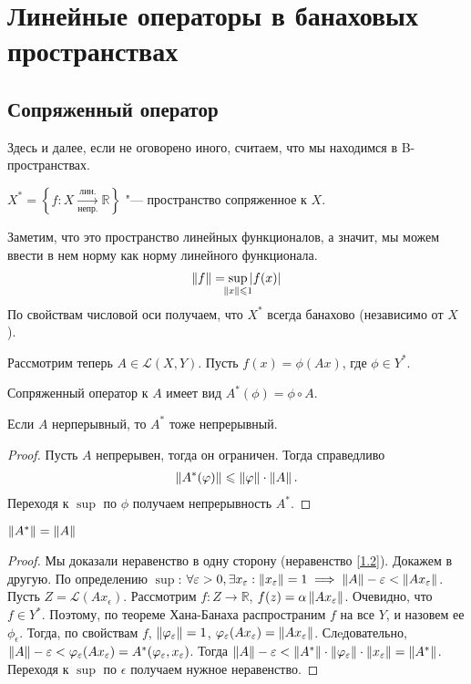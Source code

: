 \section{Линейные операторы в банаховых пространствах}
\subsection{Сопряженный оператор}

Здесь и далее, если не оговорено иного, считаем, что мы находимся в B-пространствах.

\begin{definition}
    $X^* = \left\{ f : X \xrightarrow[\text{непр.}]{\text{лин.}} \mathbb{R} \right\}$ "--- пространство сопряженное к $X$.
\end{definition}
Заметим, что это пространство линейных функционалов, а значит, мы можем ввести в нем норму как норму линейного функционала.
\begin{gather}
    \norm{f} = \sup_{\mathclap{\norm{x} \leqslant 1}} \abs{f(x)}  \\
\end{gather}
По свойствам числовой оси получаем, что $X^*$ всегда банахово (независимо от $X$).

Рассмотрим теперь $A \in \mathcal{L}(X, Y)$. Пусть $f(x) = \phi(Ax)$, где $\phi \in Y^*$.
\begin{definition}
    Сопряженный оператор к $A$ имеет вид $A^*(\phi) = \phi \circ A$.
\end{definition}
\begin{statement}
    Если $A$ нерперывный, то $A^*$ тоже непрерывный.
\end{statement}
\begin{proof}
    Пусть $A$ непрерывен, тогда он ограничен. Тогда справедливо
    \begin{gather}
        \left\|A^*(\varphi)\right\| \leqslant \left\|\varphi\right\| \cdot \left\|A\right\|\text{.} \label{1.2}
    \end{gather}
    Переходя к $\sup$ по $\phi$ получаем непрерывность $A^*$.
\end{proof}
\begin{theorem} \label{th1.2}
    $\left\|A^*\right\| = \left\|A\right\|$
\end{theorem}
\begin{proof}
    Мы доказали неравенство в одну сторону (неравенство \ref{1.2}). Докажем в другую.
    По определению $\sup$:
    $\forall \varepsilon > 0, \exists x_{\varepsilon} : \left\|x_{\varepsilon}\right\| = 1 \implies \left\|A\right\| - \varepsilon < \left\|Ax_{\varepsilon}\right\|$.
    Пусть $Z = \mathcal{L}(Ax_{\epsilon})$. Рассмотрим $f : Z \rightarrow \mathbb{R}$, $f(z) = \alpha\left\|Ax_{\varepsilon}\right\|$.
    Очевидно, что $f \in Y^*$.
    Поэтому, по теореме Хана-Банаха распространим $f$ на все $Y$, и назовем ее $\phi_{\epsilon}$.
    Тогда, по свойствам $f$, $\left\|\varphi_{\varepsilon}\right\| = 1$, $\varphi_{\varepsilon}(Ax_{\varepsilon}) = \left\|Ax_{\varepsilon}\right\|$.
    Слeдовательно, $\left\|A\right\| - \varepsilon < \varphi_{\varepsilon}(Ax_{\varepsilon}) = A^*(\varphi_{\varepsilon}, x_{\varepsilon})$.
    Тогда $\left\|A\right\| - \varepsilon < \left\|A^*\right\| \cdot \left\|\varphi_{\varepsilon}\right\| \cdot \left\|x_{\varepsilon}\right\| = \left\|A^*\right\|$.
    Переходя к $\sup$ по $\epsilon$ получаем нужное неравенство.
\end{proof}

